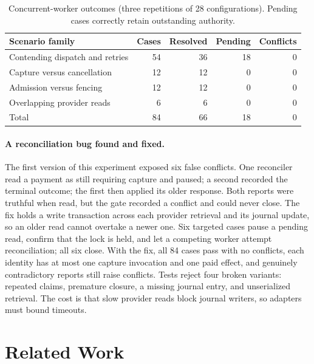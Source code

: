 \documentclass[runningheads]{llncs}
\begin{document}
\begin{table}[t]
\centering\small
\caption{Concurrent-worker outcomes (three repetitions of 28 configurations).
Pending cases correctly retain outstanding authority.}
\label{tab:concurrent}
\begin{tabularx}{\linewidth}{@{}>{\raggedright\arraybackslash}X r r r r@{}}
\toprule
Scenario family & Cases & Resolved & Pending & Conflicts \\
\midrule
Contending dispatch and retries & 54 & 36 & 18 & 0 \\
Capture versus cancellation & 12 & 12 & 0 & 0 \\
Admission versus fencing & 12 & 12 & 0 & 0 \\
Overlapping provider reads & 6 & 6 & 0 & 0 \\
\midrule
Total & 84 & 66 & 18 & 0 \\
\bottomrule
\end{tabularx}
\end{table}

\paragraph{A reconciliation bug found and fixed.}
The first version of this experiment exposed six false conflicts. One
reconciler read a payment as still requiring capture and paused; a second
recorded the terminal outcome; the first then applied its older response. Both
reports were truthful when read, but the gate recorded a conflict and could
never close. The fix holds a write transaction across each provider retrieval
and its journal update, so an older read cannot overtake a newer one. Six
targeted cases pause a pending read, confirm that the lock is held, and let a
competing worker attempt reconciliation; all six close. With the fix, all 84
cases pass with no conflicts, each identity has at most one capture invocation
and one paid effect, and genuinely contradictory reports still raise conflicts.
Tests reject four broken variants: repeated claims, premature closure, a
missing journal entry, and unserialized retrieval. The cost is that slow
provider reads block journal writers, so adapters must bound timeouts.

\section{Related Work}
\label{sec:related}
\end{document}
